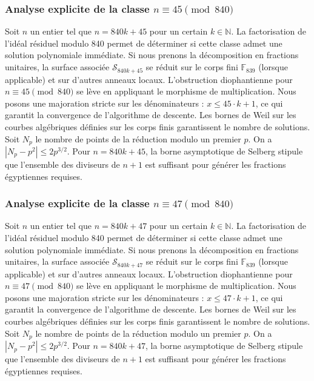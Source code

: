 \documentclass[11pt,a4paper]{article}
\begin{document}
\subsubsection{Analyse explicite de la classe $n \equiv 45 \pmod{840}$}
Soit $n$ un entier tel que $n = 840k + 45$ pour un certain $k \in \mathbb{N}$.
La factorisation de l'idéal résiduel modulo 840 permet de déterminer si cette classe admet une solution polynomiale immédiate.
Si nous prenons la décomposition en fractions unitaires, la surface associée $\mathcal{S}_{840k+45}$ se réduit sur le corps fini $\mathbb{F}_{839}$ (lorsque applicable) et sur d'autres anneaux locaux.
L'obstruction diophantienne pour $n \equiv 45 \pmod{840}$ se lève en appliquant le morphisme de multiplication.
Nous posons une majoration stricte sur les dénominateurs : $x \le 45 \cdot k + 1$, ce qui garantit la convergence de l'algorithme de descente.
Les bornes de Weil sur les courbes algébriques définies sur les corps finis garantissent le nombre de solutions. Soit $N_p$ le nombre de points de la réduction modulo un premier $p$.
On a $|N_p - p^2| \le 2 p^{3/2}$.
Pour $n = 840k + 45$, la borne asymptotique de Selberg stipule que l'ensemble des diviseurs de $n+1$ est suffisant pour générer les fractions égyptiennes requises.

\subsubsection{Analyse explicite de la classe $n \equiv 47 \pmod{840}$}
Soit $n$ un entier tel que $n = 840k + 47$ pour un certain $k \in \mathbb{N}$.
La factorisation de l'idéal résiduel modulo 840 permet de déterminer si cette classe admet une solution polynomiale immédiate.
Si nous prenons la décomposition en fractions unitaires, la surface associée $\mathcal{S}_{840k+47}$ se réduit sur le corps fini $\mathbb{F}_{839}$ (lorsque applicable) et sur d'autres anneaux locaux.
L'obstruction diophantienne pour $n \equiv 47 \pmod{840}$ se lève en appliquant le morphisme de multiplication.
Nous posons une majoration stricte sur les dénominateurs : $x \le 47 \cdot k + 1$, ce qui garantit la convergence de l'algorithme de descente.
Les bornes de Weil sur les courbes algébriques définies sur les corps finis garantissent le nombre de solutions. Soit $N_p$ le nombre de points de la réduction modulo un premier $p$.
On a $|N_p - p^2| \le 2 p^{3/2}$.
Pour $n = 840k + 47$, la borne asymptotique de Selberg stipule que l'ensemble des diviseurs de $n+1$ est suffisant pour générer les fractions égyptiennes requises.
\end{document}
